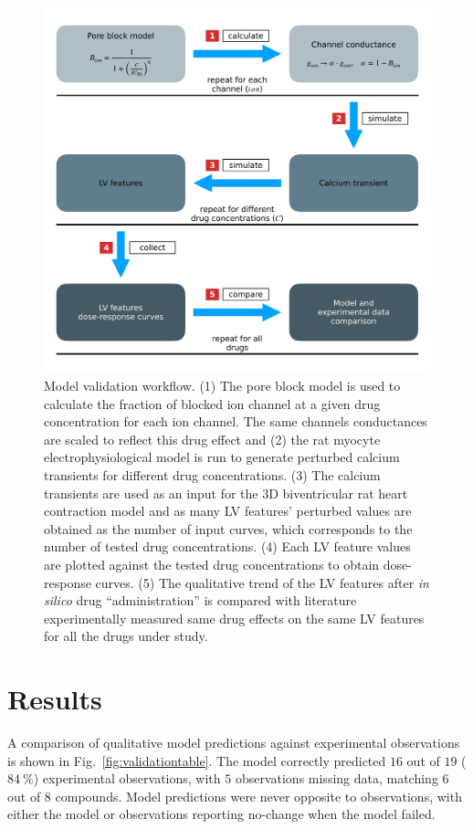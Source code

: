 \begin{figure}[!ht]
    \myfloatalign
    \includegraphics[width=\textwidth]{figures/chapter06/model_validation_schematic.pdf}
    \caption{Model validation workflow. (1) The pore block model is used to calculate the fraction of blocked ion channel at a given drug concentration for each ion channel. The same channels conductances are scaled to reflect this drug effect and (2) the rat myocyte electrophysiological model is run to generate perturbed calcium transients for different drug concentrations. (3) The calcium transients are used as an input for the $3$D biventricular rat heart contraction model and as many LV features' perturbed values are obtained as the number of input curves, which corresponds to the number of tested drug concentrations. (4) Each LV feature values are plotted against the tested drug concentrations to obtain dose-response curves. (5) The qualitative trend of the LV features after \textit{in silico} drug ``administration'' is compared with literature experimentally measured same drug effects on the same LV features for all the drugs under study.}
    \label{fig:validationschematic}
\end{figure}


%
%
%
\section{Results}\label{sec:ch6results}
A comparison of qualitative model predictions against experimental observations is shown in Fig.~\ref{fig:validationtable}. The model correctly predicted $16$ out of $19$ ($\SI{84}{\percent}$) experimental observations, with $5$ observations missing data, matching $6$ out of $8$ compounds. Model predictions were never opposite to observations, with either the model or observations reporting no-change when the model failed.

